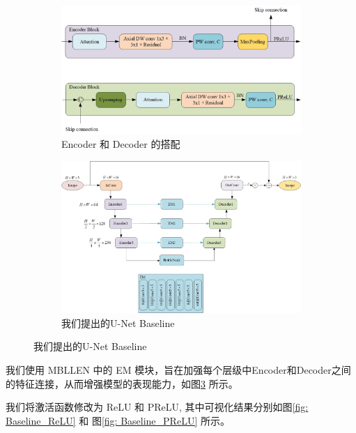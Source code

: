 \documentclass[a4paper]{ctexart}
\begin{document}
	\begin{figure}[htbp]
		\centering
		\begin{subfigure}{0.5\textwidth}
			\includegraphics[width=\linewidth]{picture/LLIE/Experiment/Encoder and Decoder}
			\captionsetup{font=scriptsize}
			\caption{Encoder 和 Decoder 的搭配}
			\label{fig: Encoder and Decoder}
		\end{subfigure}
		\begin{subfigure}{0.8\textwidth}
			\includegraphics[width=\linewidth]{picture/LLIE/Experiment/Baseline}
			\captionsetup{font=scriptsize}
			\caption{我们提出的U-Net Baseline}
			\label{fig: Baseline}
		\end{subfigure}
	\end{figure}
	
	我们使用 MBLLEN\cite{lv2018mbllen} 中的 EM 模块，旨在加强每个层级中Encoder和Decoder之间的特征连接，从而增强模型的表现能力，如图\ref{fig: Baseline} 所示。
	
	
	我们将激活函数修改为 ReLU 和 PReLU, 其中可视化结果分别如图\ref{fig: Baseline_ReLU} 和 图\ref{fig: Baseline_PReLU} 所示。
	
\end{document}
